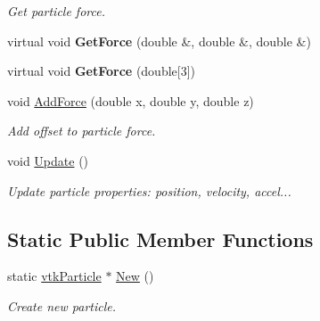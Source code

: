 \begin{DoxyCompactItemize}
\begin{DoxyCompactList}\small\item\em Get particle force. \item\end{DoxyCompactList}\item 
\hypertarget{classvtkParticle_a3f4baada18d1c4b7453b03c8a5d5e90b}{
virtual void {\bfseries GetForce} (double \&, double \&, double \&)}
\label{classvtkParticle_a3f4baada18d1c4b7453b03c8a5d5e90b}

\item 
\hypertarget{classvtkParticle_a3b2022c4e1359ca46663011b9da3ec24}{
virtual void {\bfseries GetForce} (double\mbox{[}3\mbox{]})}
\label{classvtkParticle_a3b2022c4e1359ca46663011b9da3ec24}

\item 
\hypertarget{classvtkParticle_aca8c9b7ba2c703d7977bb8a3a416f7b4}{
void \hyperlink{classvtkParticle_aca8c9b7ba2c703d7977bb8a3a416f7b4}{AddForce} (double x, double y, double z)}
\label{classvtkParticle_aca8c9b7ba2c703d7977bb8a3a416f7b4}

\begin{DoxyCompactList}\small\item\em Add offset to particle force. \item\end{DoxyCompactList}\item 
void \hyperlink{classvtkParticle_ae95885babf914d7cbc5f091313cd866b}{Update} ()
\begin{DoxyCompactList}\small\item\em Update particle properties: position, velocity, accel... \item\end{DoxyCompactList}\end{DoxyCompactItemize}
\subsection*{Static Public Member Functions}
\begin{DoxyCompactItemize}
\item 
\hypertarget{classvtkParticle_a50bb98dfdb72e8347e6fd34837aa1aae}{
static \hyperlink{classvtkParticle}{vtkParticle} $\ast$ \hyperlink{classvtkParticle_a50bb98dfdb72e8347e6fd34837aa1aae}{New} ()}
\label{classvtkParticle_a50bb98dfdb72e8347e6fd34837aa1aae}

\begin{DoxyCompactList}\small\item\em Create new particle. \item\end{DoxyCompactList}\end{DoxyCompactItemize}
